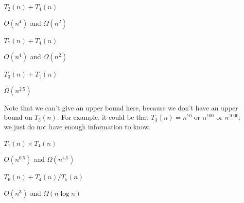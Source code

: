 \begin{prob}
\begin{subprobset}
        \begin{subprob}
            $T_2(n) + T_4(n)$

            \begin{soln}
                $O(n^4)$ and $\Omega(n^2)$
            \end{soln}
        \end{subprob}

        \begin{subprob}
            $T_7(n) + T_4(n)$

            \begin{soln}
                $O(n^4)$ and $\Omega(n^2)$
            \end{soln}
        \end{subprob}

        \begin{subprob}
            $T_3(n) + T_1(n)$

            \begin{soln}
                $\Omega(n^{2.5})$

                Note that we can't give an upper bound here, because we don't have an upper
                bound on $T_3(n)$. For example, it could be that $T_3(n) = n^{10}$ or
                $n^{100}$ or $n^{1000}$; we just do not have enough information to know.
            \end{soln}
        \end{subprob}

        \begin{subprob}
            $T_1(n) \times T_4(n)$

            \begin{soln}
                $O(n^{6.5})$ and $\Omega(n^{4.5})$

            \end{soln}
        \end{subprob}

        \begin{subprob}
            $T_6(n) + T_4(n) / T_5(n)$

            \begin{soln}
                $O(n^{3})$ and $\Omega(n \log n)$

            \end{soln}
        \end{subprob}

    \end{subprobset}

\end{prob}

